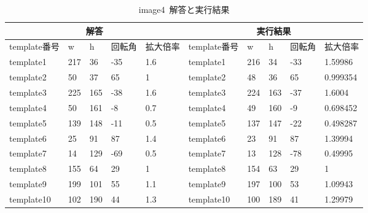 \begin{table}[]
\centering
\caption{image4~解答と実行結果}
\label{my-label4}
\begin{tabular}{|l|l|l|l|l||l|l|l|l|l|}
\hline
\multicolumn{5}{|c||}{解答}            & \multicolumn{5}{c|}{実行結果}               \\ \hline
template番号 & w   & h   & 回転角 & 拡大倍率 & template番号 & w   & h   & 回転角 & 拡大倍率     \\ \hline
template1  & 217 & 36  & -35 & 1.6  & template1  & 216 & 34  & -33 & 1.59986  \\ \hline
template2  & 50  & 37  & 65  & 1    & template2  & 48  & 36  & 65  & 0.999354 \\ \hline
template3  & 225 & 165 & -38 & 1.6  & template3  & 224 & 163 & -37 & 1.6004   \\ \hline
template4  & 50  & 161 & -8  & 0.7  & template4  & 49  & 160 & -9  & 0.698452 \\ \hline
template5  & 139 & 148 & -11 & 0.5  & template5  & 137 & 147 & -22 & 0.498287 \\ \hline
template6  & 25  & 91  & 87  & 1.4  & template6  & 23  & 91  & 87  & 1.39994  \\ \hline
template7  & 14  & 129 & -69 & 0.5  & template7  & 13  & 128 & -78 & 0.49995  \\ \hline
template8  & 155 & 64  & 29  & 1    & template8  & 154 & 63  & 29  & 1        \\ \hline
template9  & 199 & 101 & 55  & 1.1  & template9  & 197 & 100 & 53  & 1.09943  \\ \hline
template10 & 102 & 190 & 44  & 1.3  & template10 & 100 & 189 & 41  & 1.29979  \\ \hline
\end{tabular}
\end{table}